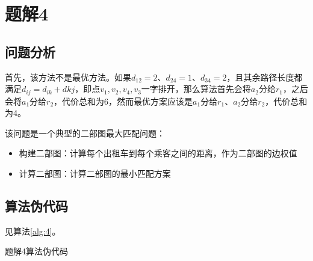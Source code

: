 \section{题解4}
\subsection{问题分析}
首先，该方法不是最优方法。如果$d_{12}=2$、$d_{24}=1$、$d_{34}=2$，且其余路径长度都满足$d_{ij}=d_{ik}+d{kj}$，即点$v_1,v_2,v_4,v_3$一字排开，那么算法首先会将$a_2$分给$r_1$，之后会将$a_1$分给$r_2$，代价总和为$6$，然而最优方案应该是$a_1$分给$r_1$、$a_2$分给$r_2$，代价总和为4。

该问题是一个典型的二部图最大匹配问题：
\begin{itemize}
    \item 构建二部图：计算每个出租车到每个乘客之间的距离，作为二部图的边权值
    \item 计算二部图：计算二部图的最小匹配方案
\end{itemize}

\subsection{算法伪代码}
见算法\ref{alg:4}。
\begin{algorithm}[htbp]
\caption{题解4算法伪代码}\label{alg:4}
\end{algorithm}